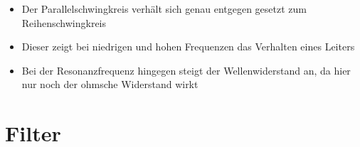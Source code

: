 \begin{frame}
\begin{center}
\begin{columns}
\begin{figure}
      \end{figure}
    \end{columns}
  \end{center}
  \begin{itemize}
    \item Der Parallelschwingkreis verhält sich genau entgegen gesetzt zum Reihenschwingkreis
    \item Dieser zeigt bei niedrigen und hohen Frequenzen das Verhalten eines Leiters
    \item Bei der Resonanzfrequenz hingegen steigt der Wellenwiderstand an, da hier nur noch der ohmsche Widerstand wirkt
  \end{itemize}
\end{frame}



\section*{Filter}
